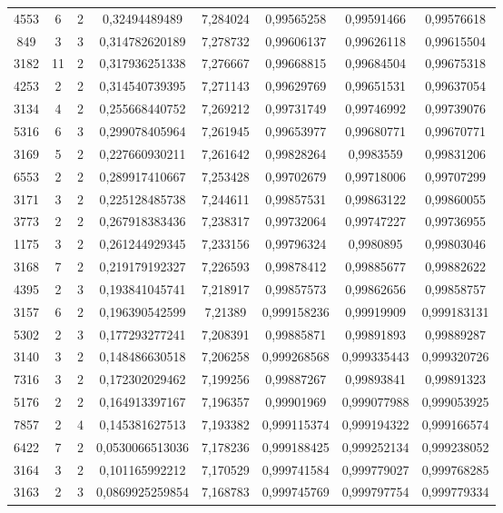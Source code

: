 \begin{longtable}{|c|c|c|c|c|c|c|c|}
4553 & 6 & 2 & 0,32494489489 & 7,284024 & 0,99565258 & 0,99591466 & 0,99576618 \\
849 & 3 & 3 & 0,314782620189 & 7,278732 & 0,99606137 & 0,99626118 & 0,99615504 \\
3182 & 11 & 2 & 0,317936251338 & 7,276667 & 0,99668815 & 0,99684504 & 0,99675318 \\
4253 & 2 & 2 & 0,314540739395 & 7,271143 & 0,99629769 & 0,99651531 & 0,99637054 \\
3134 & 4 & 2 & 0,255668440752 & 7,269212 & 0,99731749 & 0,99746992 & 0,99739076 \\
5316 & 6 & 3 & 0,299078405964 & 7,261945 & 0,99653977 & 0,99680771 & 0,99670771 \\
3169 & 5 & 2 & 0,227660930211 & 7,261642 & 0,99828264 & 0,9983559 & 0,99831206 \\
6553 & 2 & 2 & 0,289917410667 & 7,253428 & 0,99702679 & 0,99718006 & 0,99707299 \\
3171 & 3 & 2 & 0,225128485738 & 7,244611 & 0,99857531 & 0,99863122 & 0,99860055 \\
3773 & 2 & 2 & 0,267918383436 & 7,238317 & 0,99732064 & 0,99747227 & 0,99736955 \\
1175 & 3 & 2 & 0,261244929345 & 7,233156 & 0,99796324 & 0,9980895 & 0,99803046 \\
3168 & 7 & 2 & 0,219179192327 & 7,226593 & 0,99878412 & 0,99885677 & 0,99882622 \\
4395 & 2 & 3 & 0,193841045741 & 7,218917 & 0,99857573 & 0,99862656 & 0,99858757 \\
3157 & 6 & 2 & 0,196390542599 & 7,21389 & 0,999158236 & 0,99919909 & 0,999183131 \\
5302 & 2 & 3 & 0,177293277241 & 7,208391 & 0,99885871 & 0,99891893 & 0,99889287 \\
3140 & 3 & 2 & 0,148486630518 & 7,206258 & 0,999268568 & 0,999335443 & 0,999320726 \\
7316 & 3 & 2 & 0,172302029462 & 7,199256 & 0,99887267 & 0,99893841 & 0,99891323 \\
5176 & 2 & 2 & 0,164913397167 & 7,196357 & 0,99901969 & 0,999077988 & 0,999053925 \\
7857 & 2 & 4 & 0,145381627513 & 7,193382 & 0,999115374 & 0,999194322 & 0,999166574 \\
6422 & 7 & 2 & 0,0530066513036 & 7,178236 & 0,999188425 & 0,999252134 & 0,999238052 \\
3164 & 3 & 2 & 0,101165992212 & 7,170529 & 0,999741584 & 0,999779027 & 0,999768285 \\
3163 & 2 & 3 & 0,0869925259854 & 7,168783 & 0,999745769 & 0,999797754 & 0,999779334 \\

\end{longtable}
